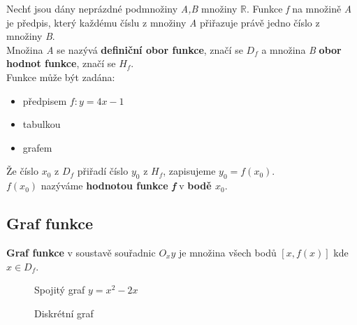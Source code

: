 \documentclass[12pt, a4paper]{article}
\begin{document}
Nechť jsou dány neprázdné podmnožiny \textit{A,B} množiny $\mathbb{R}$. Funkce \textit{f} na množině \textit{A} je předpis, který každému číslu z množiny \textit{A} přiřazuje
právě jedno číslo z množiny \textit{B}.\\
Množina \textit{A} se nazývá \textbf{definiční obor funkce}, značí se $D_f$ a množina \textit{B} \textbf{obor hodnot funkce}, značí se $H_f$.\\
Funkce může být zadána:
\begin{itemize}
\item předpisem $f: y = 4x-1$ 
\item tabulkou
\item grafem
\end{itemize}

Že číslo $x_0$ z $D_f$ přiřadí číslo $y_0$ z $H_f$, zapisujeme $y_0=f(x_0)$.\\
$f(x_0)$ nazýváme \textbf{hodnotou funkce \textit{f}} v \textbf{bodě $x_0$}.\\

\subsection*{Graf funkce}
\textbf{Graf funkce} v soustavě souřadnic $O_xy$ je množina všech bodů $[x,f(x)]$ kde $ x \in D_f $. \\
\begin{figure}[H]
\centering
{}
\caption{Spojitý graf $y=x^2-2x$}
\end{figure}

\begin{figure}[H]
\centering
{}
\caption{Diskrétní graf}
\end{figure}
\end{document}
